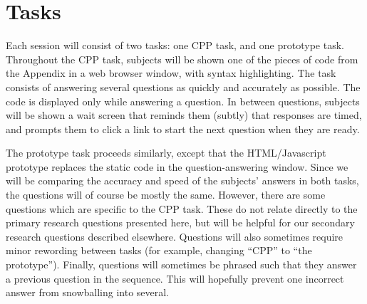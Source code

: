 \documentclass[11pt]{article}
\begin{document}




\section{Tasks}
\label{sec:tasks}

Each session will consist of two tasks: one CPP task, and one prototype task.
Throughout the CPP task, subjects will be shown one of the pieces of code from
the Appendix in a web browser window, with syntax highlighting.  The task
consists of answering several questions as quickly and accurately as possible.
The code is displayed only while answering a question.  In between questions,
subjects will be shown a wait screen that reminds them (subtly) that responses
are timed, and prompts them to click a link to start the next question when
they are ready.

The prototype task proceeds similarly, except that the HTML/Javascript
prototype replaces the static code in the question-answering window.  Since we
will be comparing the accuracy and speed of the subjects' answers in both
tasks, the questions will of course be mostly the same.  However, there are
some questions which are specific to the CPP task.  These do not relate
directly to the primary research questions presented here, but will be helpful
for our secondary research questions described elsewhere.  Questions will also
sometimes require minor rewording between tasks (for example, changing ``CPP''
to ``the prototype'').
%
Finally, questions will sometimes be phrased such that they answer a previous
question in the sequence.  This will hopefully prevent one incorrect answer
from snowballing into several.
\end{document}
